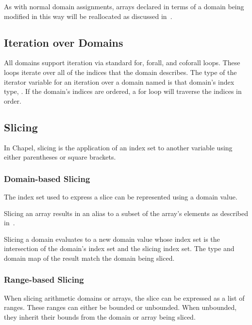 %
%

As with normal domain assignments, arrays declared in terms of a
domain being modified in this way will be reallocated as discussed
in~.



\subsection{Iteration over Domains}
\label{Iteration_over_Domains}

All domains support iteration via standard for, forall, and coforall
loops.  These loops iterate over all of the indices that the domain
describes.  The type of the iterator variable for an iteration over a
domain named  is that domain's index type, .
If the domain's indices are ordered, a for loop will traverse the
indices in order.


\subsection{Slicing}
\label{Slicing}

In Chapel, slicing is the application of an index set to another
variable using either parentheses or square brackets.


\subsubsection{Domain-based Slicing}

The index set used to express a slice can be represented using a
domain value.

Slicing an array results in an alias to a subset of the array's
elements as described in~.

Slicing a domain evaluates to a new domain value whose index set is
the intersection of the domain's index set and the slicing index set.
The type and domain map of the result match the domain being sliced.

%
%

\subsubsection{Range-based Slicing}
\label{Range_Based_Slicing}
When slicing arithmetic domains or arrays, the slice can be expressed
as a list of  ranges.  These ranges can either be bounded
or unbounded.  When unbounded, they inherit their bounds from the
domain or array being sliced.

